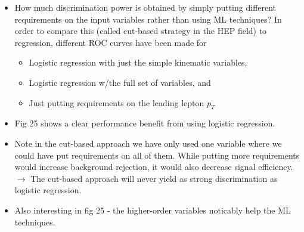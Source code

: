 \documentclass[norsk,a4paper,11pt]{article}
\begin{document}
\begin{itemize}
\begin{itemize}
		\item How much discrimination power is obtained by simply putting different requirements on the input variables rather than using ML techniques? In order to compare this (called cut-based strategy in the HEP field) to regression, different ROC curves have been made for 
		\begin{itemize}
			\item Logistic regression with just the simple kinematic variables, 
			\item Logistic regression w/the full set of variables, and 
			\item Just putting requirements on the leading lepton $p_T$
		\end{itemize}
		\item Fig 25 shows a clear performance benefit from using logistic regression.
		\item Note in the cut-based approach we have only used one variable where we could have put requirements on all of them. While putting more requirements would increase background rejection, it would also decrease signal efficiency. $\rightarrow$ The cut-based approach will never yield as strong discrimination as logistic regression.
		\item Also interesting in fig 25 - the higher-order variables noticably help the ML techniques. 
	\end{itemize}
\end{itemize}
\end{document}
